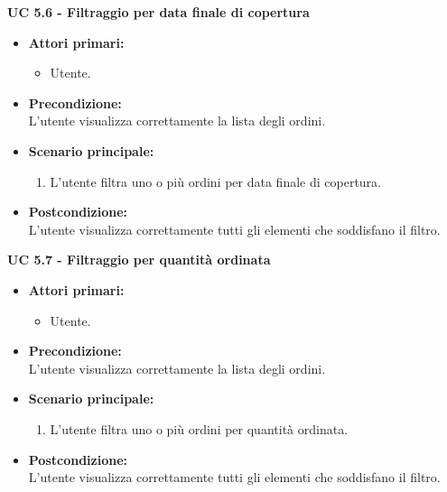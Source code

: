 \vspace{0.5cm}

\noindent \textbf{\large UC 5.6 - Filtraggio per data finale di copertura}
\label{uc:filtraggio-data-finale-copertura}
\begin{itemize}

	\item \textbf{Attori primari: }
		\begin{itemize}
			\item Utente.
		\end{itemize}

	\item \textbf{Precondizione: }\\[0.3cm]
		L'utente visualizza correttamente la lista degli ordini.

	\item \textbf{Scenario principale: }
		\begin{enumerate}
			\item L'utente filtra uno o più ordini per data finale di copertura.
		\end{enumerate}
		

	\item \textbf{Postcondizione: }\\[0.3cm]
		L'utente visualizza correttamente tutti gli elementi che soddisfano il filtro.

\end{itemize}

\vspace{0.5cm}

\noindent \textbf{\large UC 5.7 - Filtraggio per quantità ordinata}
\label{uc:filtraggio-quantità-ordinata}
\begin{itemize}

	\item \textbf{Attori primari: }
		\begin{itemize}
			\item Utente.
		\end{itemize}

	\item \textbf{Precondizione: }\\[0.3cm]
		L'utente visualizza correttamente la lista degli ordini.

	\item \textbf{Scenario principale: }
		\begin{enumerate}
			\item L'utente filtra uno o più ordini per quantità ordinata.
		\end{enumerate}
		

	\item \textbf{Postcondizione: }\\[0.3cm]
		L'utente visualizza correttamente tutti gli elementi che soddisfano il filtro.

\end{itemize}

